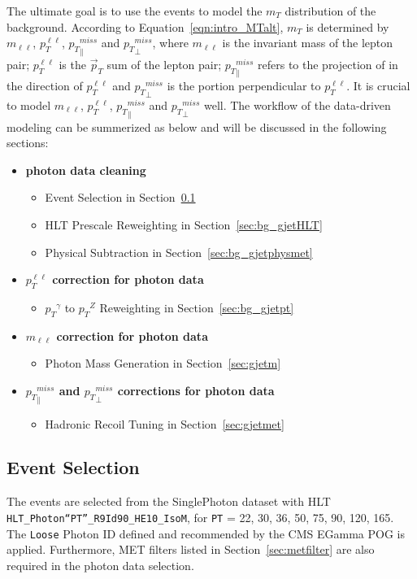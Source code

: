 \vspace{0.3cm}
The ultimate goal is to use the \gjets events to model the $m_T$ distribution of the \Zjets background. According to Equation~\ref{eqn:intro_MTalt}, $m_T$ is determined by $m_{\ell\ell}$, ${p}_{T}^{\ell\ell}$, ${p_{T}}^{miss}_\parallel$ and ${p_{T}}^{miss}_\perp$, where $m_{\ell\ell}$ is the invariant mass of the lepton pair; ${p}_{T}^{\ell\ell}$ is the $\vec p_T$ sum of the lepton pair; ${p_{T}}^{miss}_\parallel$ refers to the projection of \ptmiss in the direction of ${p}_{T}^{\ell\ell}$ and ${p_{T}}^{miss}_\perp$ is the portion perpendicular to ${p}_{T}^{\ell\ell}$. It is crucial to model $m_{\ell\ell}$, ${p}_{T}^{\ell\ell}$, ${p_{T}}^{miss}_\parallel$ and ${p_{T}}^{miss}_\perp$ well. The workflow of the \Zjets data-driven modeling can be summerized as below and will be discussed in the following sections:
\begin{itemize}
\item \textbf{photon data cleaning}
\begin{itemize}
\item \gjets Event Selection in Section~\ref{sec:bg_gjetsel}
\item \gjets HLT Prescale Reweighting in Section~\ref{sec:bg_gjetHLT}
\item Physical \ptmiss Subtraction in Section~\ref{sec:bg_gjetphysmet}
\end{itemize}
\item \textbf{${p}_{T}^{\ell\ell}$ correction for photon data}
\begin{itemize}
\item ${p_T}^{\gamma}$ to ${p_T}^Z$ Reweighting in Section~\ref{sec:bg_gjetpt}
\end{itemize}
\item \textbf{$m_{\ell\ell}$ correction for photon data}
\begin{itemize}
\item Photon Mass Generation in Section~\ref{sec:gjetm}
\end{itemize}
\item \textbf{${p_{T}}^{miss}_\parallel$ and ${p_{T}}^{miss}_\perp$ corrections for photon data}
\begin{itemize}
\item \ptmiss Hadronic Recoil Tuning in Section~\ref{sec:gjetmet}
\end{itemize}
\end{itemize}

\subsection{\boldmath{\gjets} Event Selection}\label{sec:bg_gjetsel}
The \gjets events are selected from the SinglePhoton dataset with HLT \texttt{HLT\_Photon``PT''\_R9Id90\_HE10\_IsoM}, for \texttt{PT} = 22, 30, 36, 50, 75, 90, 120, 165\GeV. The \texttt{Loose} Photon ID defined and recommended by the CMS EGamma POG is applied. Furthermore, MET filters listed in Section~\ref{sec:metfilter} are also required in the photon data selection.

